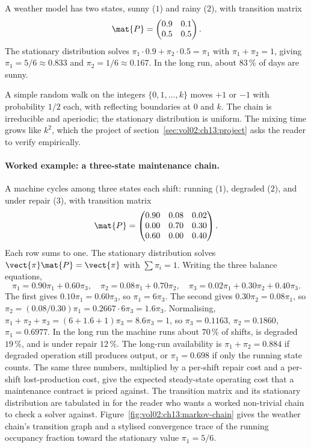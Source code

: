A weather model has two states, sunny ($1$) and rainy ($2$), with
transition matrix
\[
\mat{P} = \begin{pmatrix} 0.9 & 0.1 \\ 0.5 & 0.5 \end{pmatrix}.
\]
The stationary distribution solves $\pi_{1} \cdot 0.9 + \pi_{2}
\cdot 0.5 = \pi_{1}$ with $\pi_{1} + \pi_{2} = 1$, giving
$\pi_{1} = 5/6 \approx 0.833$ and $\pi_{2} = 1/6 \approx 0.167$.
In the long run, about $83\,\%$ of days are sunny.

A simple random walk on the integers $\{0, 1, \ldots, k\}$ moves
$+1$ or $-1$ with probability $1/2$ each, with reflecting
boundaries at $0$ and $k$. The chain is irreducible and aperiodic;
the stationary distribution is uniform. The mixing time grows like
$k^{2}$, which the project of
section~\ref{sec:vol02:ch13:project} asks the reader to verify
empirically.

\paragraph{Worked example: a three-state maintenance chain.}
A machine cycles among three states each shift: running ($1$),
degraded ($2$), and under repair ($3$), with transition matrix
\[
\mat{P} = \begin{pmatrix}
0.90 & 0.08 & 0.02 \\
0.00 & 0.70 & 0.30 \\
0.60 & 0.00 & 0.40
\end{pmatrix}.
\]
Each row sums to one. The stationary distribution solves
$\vect{\pi}\mat{P} = \vect{\pi}$ with $\sum \pi_{i} = 1$. Writing
the three balance equations,
\[
\pi_{1} = 0.90\pi_{1} + 0.60\pi_{3}, \quad
\pi_{2} = 0.08\pi_{1} + 0.70\pi_{2}, \quad
\pi_{3} = 0.02\pi_{1} + 0.30\pi_{2} + 0.40\pi_{3}.
\]
The first gives $0.10\pi_{1} = 0.60\pi_{3}$, so $\pi_{1} =
6\pi_{3}$. The second gives $0.30\pi_{2} = 0.08\pi_{1}$, so
$\pi_{2} = (0.08/0.30)\pi_{1} = 0.2667 \cdot 6\pi_{3} = 1.6\pi_{3}$.
Normalising, $\pi_{1} + \pi_{2} + \pi_{3} = (6 + 1.6 + 1)\pi_{3} =
8.6\pi_{3} = 1$, so $\pi_{3} = 0.1163$, $\pi_{2} = 0.1860$,
$\pi_{1} = 0.6977$. In the long run the machine runs about
$70\,\%$ of shifts, is degraded $19\,\%$, and is under repair
$12\,\%$. The long-run availability is $\pi_{1} + \pi_{2} = 0.884$
if degraded operation still produces output, or $\pi_{1} = 0.698$
if only the running state counts. The same three numbers, multiplied
by a per-shift repair cost and a per-shift lost-production cost,
give the expected steady-state operating cost that a maintenance
contract is priced against. The transition matrix and its stationary
distribution are tabulated in
for the reader who wants a worked non-trivial chain to check a
solver against. Figure~\ref{fig:vol02:ch13:markov-chain} gives the
weather chain's transition graph and a stylised convergence trace
of the running occupancy fraction toward the stationary value
$\pi_{1} = 5/6$.

